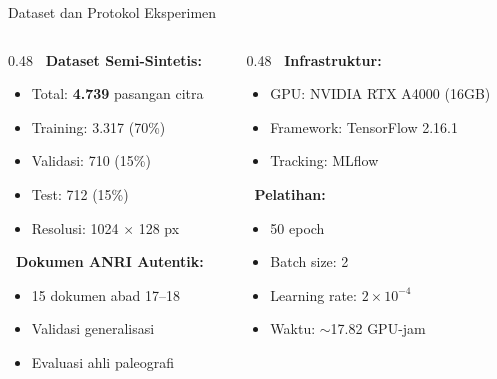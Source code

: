 \documentclass[aspectratio=169,10pt,t]{beamer}
\begin{document}
\begin{frame}{Dataset dan Protokol Eksperimen}
    \begin{columns}[T]
        \begin{column}{0.48\textwidth}
            \textbf{\faDatabase~Dataset Semi-Sintetis:}
            \begin{itemize}
                \item Total: \textbf{4.739} pasangan citra
                \item Training: 3.317 (70\%)
                \item Validasi: 710 (15\%)
                \item Test: 712 (15\%)
                \item Resolusi: 1024 $\times$ 128 px
            \end{itemize}
            
            \vspace{0.5em}
            \textbf{\faBook~Dokumen ANRI Autentik:}
            \begin{itemize}
                \item 15 dokumen abad 17--18
                \item Validasi generalisasi
                \item Evaluasi ahli paleografi
            \end{itemize}
        \end{column}
        \begin{column}{0.48\textwidth}
            \textbf{\faServer~Infrastruktur:}
            \begin{itemize}
                \item GPU: NVIDIA RTX A4000 (16GB)
                \item Framework: TensorFlow 2.16.1
                \item Tracking: MLflow
            \end{itemize}
            
            \vspace{0.5em}
            \textbf{\faClock~Pelatihan:}
            \begin{itemize}
                \item 50 epoch
                \item Batch size: 2
                \item Learning rate: $2 \times 10^{-4}$
                \item Waktu: $\sim$17.82 GPU-jam
            \end{itemize}
        \end{column}
    \end{columns}
\end{frame}
\end{document}
